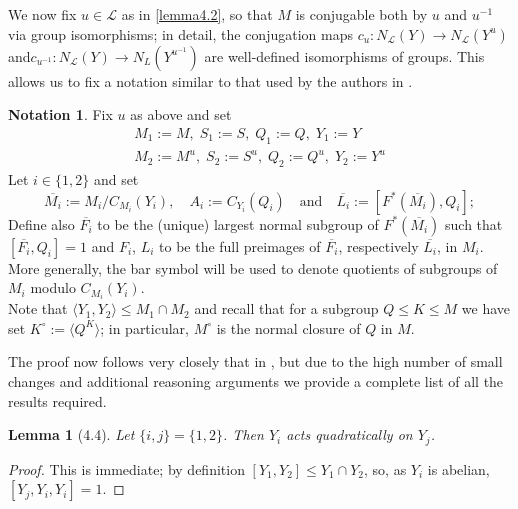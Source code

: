 \documentclass{amsart}
\numberwithin{equation}{section}
\newtheorem{lemma}[equation]{Lemma}
\theoremstyle{definition}
\newtheorem{notation}[equation]{Notation}
\theoremstyle{subresult}
\theoremstyle{caseresult}
\renewcommand{\L}{\mathcal{L}}
\newcommand{\ov}{\overline}
\newcommand{\inv}{^{-1}}
\newcommand{\fto}{\longrightarrow}
\newcommand{\<}{\langle}
\renewcommand{\>}{\rangle}
\begin{document}
We now fix $u \in \L$ as in \ref{lemma4.2}, so that $M$ is conjugable both by $u$ and $u\inv$ via group isomorphisms; in detail, the conjugation maps $c_u: N_\L(Y) \fto N_\L(Y^u)$ and$c_{u\inv} \colon N_\L(Y) \fto N_L(Y^{u\inv})$ are well-defined isomorphisms of groups. This allows us to fix a notation similar to that used by the authors in \cite{Meier-Stell-Stroth:2012}.

\begin{notation}\label{notation4.3}
	Fix $u$ as above and set
	\begin{gather*}
		M_1 := M, \; S_1 := S, \; Q_1 := Q, \; Y_1 := Y \\
		M_2 := M^u, \; S_2 := S^u, \; Q_2 := Q^u, \; Y_2 := Y^u
	\end{gather*}
	Let $i \in \{1,2\}$ and set
	\[
	\ov{M_i} := M_i / C_{M_i}(Y_i),  \quad A_i := C_{Y_i}(Q_i) \quad \text{and} \quad \ov{L_i}:= [F^*(\ov{M_i}),Q_i];
	\]
	Define also $\ov{F_i}$ to be the (unique) largest normal subgroup of $F^*(\ov{M_i})$ such that $[\ov{F_i},Q_i] = 1$ and $F_i$, $L_i$ to be the full preimages of $\ov{F_i}$, respectively $\ov{L_i}$, in $M_i$. More generally, the bar symbol will be used to denote quotients of subgroups of $M_i$ modulo $C_{M_i}(Y_i)$.\\
	Note that $\< Y_1,Y_2 \> \le M_1 \cap M_2$ and recall that for a subgroup $Q \le K \le M$ we have set $K^\circ := \<Q^K\>$; in particular, $M^\circ$ is the normal closure of $Q$ in $M$.
\end{notation}

The proof now follows very closely that in \cite[Chapter 4]{Meier-Stell-Stroth:2012}, but due to the high number of small changes and additional reasoning arguments we provide a complete list of all the results required. 

\begin{lemma}[4.4]\label{lemma4.4}
	Let $\{i,j\} = \{1,2\}$. Then $Y_i$ acts quadratically on $Y_j$.
\end{lemma}
\begin{proof}
	This is immediate; by definition $[Y_1,Y_2] \le Y_1 \cap Y_2$, so, as $Y_i$ is abelian, $[Y_j,Y_i,Y_i] = 1$.
\end{proof}
\end{document}
